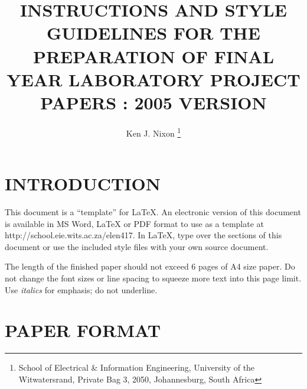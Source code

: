 \documentclass[10pt,twocolumn]{witseiepaper}
\begin{document}
\title{INSTRUCTIONS AND STYLE GUIDELINES FOR THE PREPARATION OF FINAL YEAR LABORATORY PROJECT PAPERS : 2005 VERSION}

\author{Ken J. Nixon
\thanks{School of Electrical \& Information Engineering, University of the
Witwatersrand, Private Bag 3, 2050, Johannesburg, South Africa}
}


%



\maketitle
\thispagestyle{empty}\pagestyle{empty}


%
\section{INTRODUCTION}

This document is a ``template'' for \LaTeX. An electronic version of this
document is available in MS Word, LaTeX or PDF format to use as a template at
http://school.eie.wits.ac.za/elen417.  In \LaTeX, type over the sections of
this document or use the included style files with your own source document.

The length of the finished paper should not exceed 6 pages of A4 size paper. Do
not change the font sizes or line spacing to squeeze more text into this page
limit. Use {\sl italics} for emphasis; do not underline.


%
\section{PAPER FORMAT}

\end{document}
